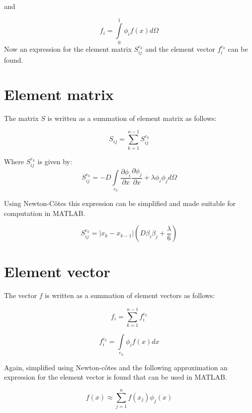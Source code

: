 \documentclass[a4paper]{report}
\begin{document}
and 

\begin{equation}
f_i = \int\limits_{0}^{1} \phi_i f(x) d\Omega
\end{equation}
Now an expression for the element matrix $ S_{ij}^{e_k}$ and the element vector $ f_{i}^{e_k} $ can be found.

\section{Element matrix}\label{Element_matrix}
The matrix $S$ is written as a summation of element matrix as follows:

\begin{equation}
S_{ij} =\sum\limits_{k=1}^{n-1} S^{e_k}_{ij} 
\end{equation}
\medskip

Where $S_{ij}^{e_k}$ is given by:
\begin{equation}
S^{e_k}_{ij} = -D\int\limits_{e_k}\frac{\partial \phi_i}{\partial x}\frac{\partial \phi_j}{\partial x} +\lambda\phi_i\phi_j d\Omega
\end{equation}

Using Newton-Côtes this expression can be simplified and made suitable for computation in MATLAB. 

\begin{equation}
S^{e_k}_{ij} = \lvert x_k-x_{k-1} \lvert (D\beta_i \beta_j +\frac{\lambda}{6})
\end{equation}



\section{Element vector}\label{Element_vector}
The vector $f$ is written as a summation of element vectors as follows:

\begin{equation}
f_{i} =\sum\limits_{k=1}^{n-1} f^{e_k}_{i} 
\end{equation}

\begin{equation}
f^{e_k}_i = \int\limits_{e_k}\phi_i f(x) dx
\end{equation}

Again, simplified using Newton-côtes and the following approximation an expression for the element vector is found that can be used in MATLAB.

\begin{equation}
f(x) \approx \sum\limits_{j=1}^{n} f(x_j)\phi_j(x)
\end{equation}
\end{document}
